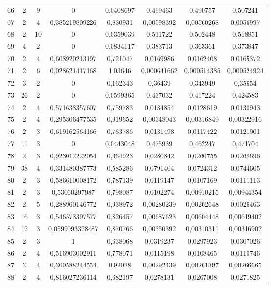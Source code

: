 \begin{longtable}{|c|c|c|c|c|c|c|c|}
66 & 2 & 9 & 0 & 0,0408697 & 0,499463 & 0,490757 & 0,507241  \\
67 & 2 & 4 & 0,385219809226 & 0,830931 & 0,00598392 & 0,00560268 & 0,0056997  \\
68 & 2 & 10 & 0 & 0,0359039 & 0,511722 & 0,502448 & 0,518851  \\
69 & 4 & 2 & 0 & 0,0834117 & 0,383713 & 0,363361 & 0,373847  \\
70 & 2 & 4 & 0,608920213197 & 0,721047 & 0,0169986 & 0,0162408 & 0,0165372  \\
71 & 2 & 6 & 0,028621417168 & 1,03646 & 0,000641662 & 0,000514385 & 0,000524924  \\
72 & 3 & 2 & 0 & 0,162343 & 0,36439 & 0,343949 & 0,35654  \\
73 & 26 & 2 & 0 & 0,0599365 & 0,437032 & 0,417224 & 0,424583  \\
74 & 2 & 4 & 0,571638357607 & 0,759783 & 0,0134854 & 0,0128619 & 0,0130943  \\
75 & 2 & 4 & 0,295806477535 & 0,919652 & 0,00348043 & 0,00316849 & 0,00322916  \\
76 & 2 & 3 & 0,619162564166 & 0,763786 & 0,0131498 & 0,0117422 & 0,0121901  \\
77 & 11 & 3 & 0 & 0,0443048 & 0,475939 & 0,462247 & 0,471704  \\
78 & 2 & 3 & 0,923012222054 & 0,664923 & 0,0280842 & 0,0260755 & 0,0268696  \\
79 & 38 & 4 & 0,331480387773 & 0,585286 & 0,0791404 & 0,0724312 & 0,0744605  \\
80 & 2 & 3 & 0,586610008172 & 0,787139 & 0,0119147 & 0,0107169 & 0,0111113  \\
81 & 2 & 3 & 0,53060297987 & 0,798087 & 0,0102274 & 0,00910215 & 0,00944354  \\
82 & 2 & 5 & 0,288960146772 & 0,938972 & 0,00280239 & 0,00262648 & 0,0026463  \\
83 & 16 & 3 & 0,546573397577 & 0,826457 & 0,00687623 & 0,00604448 & 0,00619402  \\
84 & 12 & 3 & 0,0599093328487 & 0,870766 & 0,00350392 & 0,00310311 & 0,00316902  \\
85 & 2 & 3 & 1 & 0,638068 & 0,0319237 & 0,0297923 & 0,0307026  \\
86 & 2 & 4 & 0,516903002911 & 0,778071 & 0,0115198 & 0,0108465 & 0,0110746  \\
87 & 3 & 4 & 0,300588244554 & 0,92028 & 0,00292439 & 0,00261397 & 0,00266665  \\
88 & 2 & 4 & 0,816027236114 & 0,682197 & 0,0278131 & 0,0267008 & 0,0271825  \\

\end{longtable}
